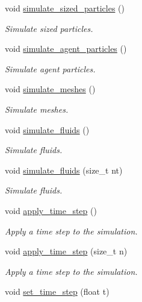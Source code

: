 \begin{DoxyCompactItemize}
void \hyperlink{classphysim_1_1simulator_ac99a02f99b4f83501478093d402abea5}{simulate\+\_\+sized\+\_\+particles} ()
\begin{DoxyCompactList}\small\item\em Simulate sized particles. \end{DoxyCompactList}\item 
void \hyperlink{classphysim_1_1simulator_a99dbf5870ec5383266f87e60c1686049}{simulate\+\_\+agent\+\_\+particles} ()
\begin{DoxyCompactList}\small\item\em Simulate agent particles. \end{DoxyCompactList}\item 
void \hyperlink{classphysim_1_1simulator_aea4165314f9285dfc3b64ba9a2666aaf}{simulate\+\_\+meshes} ()
\begin{DoxyCompactList}\small\item\em Simulate meshes. \end{DoxyCompactList}\item 
void \hyperlink{classphysim_1_1simulator_a63f7f4b59a79b8b294aaa6d8870fccd2}{simulate\+\_\+fluids} ()
\begin{DoxyCompactList}\small\item\em Simulate fluids. \end{DoxyCompactList}\item 
void \hyperlink{classphysim_1_1simulator_acb3359c9faedfc69191bf9a4618eebfa}{simulate\+\_\+fluids} (size\+\_\+t nt)
\begin{DoxyCompactList}\small\item\em Simulate fluids. \end{DoxyCompactList}\item 
void \hyperlink{classphysim_1_1simulator_a1bef71687a4b46373753847a5d2112ff}{apply\+\_\+time\+\_\+step} ()
\begin{DoxyCompactList}\small\item\em Apply a time step to the simulation. \end{DoxyCompactList}\item 
void \hyperlink{classphysim_1_1simulator_a5bee70bb8d7f0744e47f1ae76b3c8189}{apply\+\_\+time\+\_\+step} (size\+\_\+t n)
\begin{DoxyCompactList}\small\item\em Apply a time step to the simulation. \end{DoxyCompactList}\item 
void \hyperlink{classphysim_1_1simulator_ab86bf6d22fd222a299183c9d82a71bc1}{set\+\_\+time\+\_\+step} (float t)

\end{DoxyCompactItemize}
